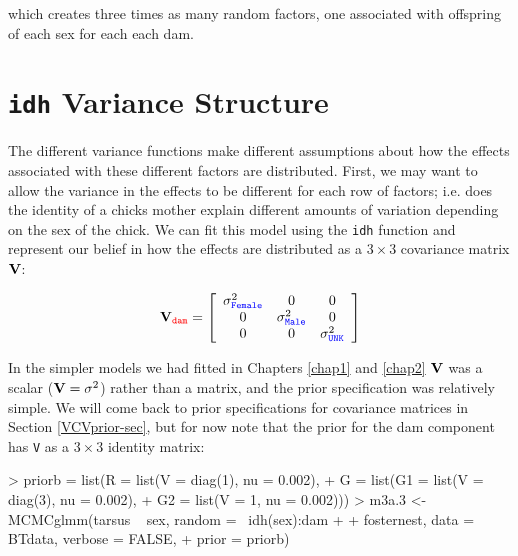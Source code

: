 \documentclass{article}
\begin{document}
which creates three times as many random factors, one associated with offspring of each sex for each each dam.  

\section{\texttt{idh} Variance Structure}

The different variance functions make different assumptions about how the effects associated with these different factors are distributed. First, we may want to allow the variance in the effects to be different for each row of factors; i.e. does the identity of a chicks mother explain different amounts of variation depending on the sex of the chick. We can fit this model using the \texttt{idh} function and represent our belief in how the effects are distributed as a $3\times3$ covariance matrix ${\bf V}$:    

\begin{displaymath}
{\bf V}_{{\color{red} \texttt{dam}}}=
\left[
\begin{array}{ccc}
\sigma^{2}_{\color{blue}\texttt{Female}}&0&0\\
0&\sigma^{2}_{\color{blue}\texttt{Male}}&0\\
0&0&\sigma^{2}_{\color{blue}\texttt{UNK}}\\
\end{array}
\right]
\end{displaymath}

In the simpler models we had fitted in Chapters \ref{chap1} and \ref{chap2} ${\bf V}$ was a scalar (${\bf V} = \sigma^{2}$) rather than a matrix, and the prior specification was relatively simple.  We will come back to prior specifications for covariance matrices in Section \ref{VCVprior-sec}, but for now note that the prior for the dam component has \texttt{V} as a $3\times3$ identity matrix:  

\begin{Schunk}
\begin{Sinput}
> priorb = list(R = list(V = diag(1), nu = 0.002), 
+     G = list(G1 = list(V = diag(3), nu = 0.002), 
+         G2 = list(V = 1, nu = 0.002)))
> m3a.3 <- MCMCglmm(tarsus ~ sex, random = ~idh(sex):dam + 
+     fosternest, data = BTdata, verbose = FALSE, 
+     prior = priorb)
\end{Sinput}
\end{Schunk}
\end{document}
